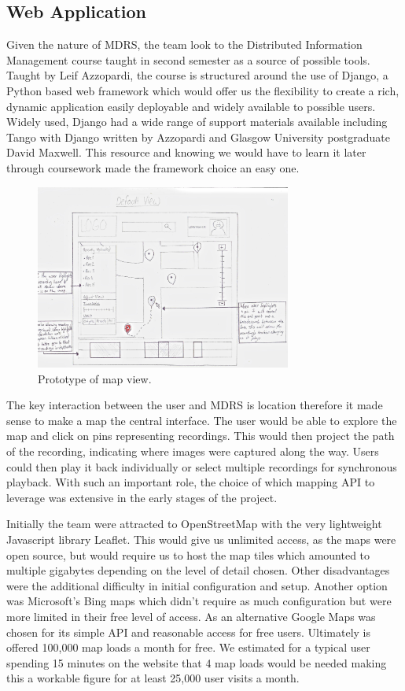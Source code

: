 \documentclass{l3proj}
\begin{document}
\subsection{Web Application}   Given the nature of MDRS, the team look to the
Distributed Information Management course taught in second semester as a source
of possible tools. Taught by Leif Azzopardi, the course is structured around the
use of Django, a Python based web framework which would offer us the flexibility
to create a rich, dynamic application easily deployable and widely available to
possible users. Widely used, Django had a wide range of support materials
available including Tango with Django written by Azzopardi and Glasgow
University postgraduate David Maxwell. This resource and knowing we would have
to learn it later through coursework made the framework choice an easy one.

\begin{figure}[ht!]
  \centering
\includegraphics[width=0.75\textwidth]{images/web-map-view.jpg}
\caption{Prototype of map view.}
\end{figure}

The key interaction between the user and MDRS is location therefore it made
sense to make a map the central interface. The user would be able to explore the
map and click on pins representing recordings. This would then project the path
of the recording, indicating where images were captured along the way. Users
could then play it back individually or select multiple recordings for
synchronous playback. With such an important role, the choice of which mapping
API to leverage was extensive in the early stages of the project.

Initially the team were attracted to OpenStreetMap with the very lightweight
Javascript library Leaflet. This would give us unlimited access, as the maps
were open source, but would require us to host the map tiles which amounted to
multiple gigabytes depending on the level of detail chosen. Other disadvantages
were the additional difficulty in initial configuration and setup. Another
option was Microsoft’s Bing maps which didn’t require as much configuration but
were more limited in their free level of access. As an alternative Google Maps
was chosen for its simple API and reasonable access for free users. Ultimately
is offered 100,000 map loads a month for free. We estimated for a typical user
spending 15 minutes on the website that 4 map loads would be needed making this
a workable figure for at least 25,000 user visits a month.
\end{document}
